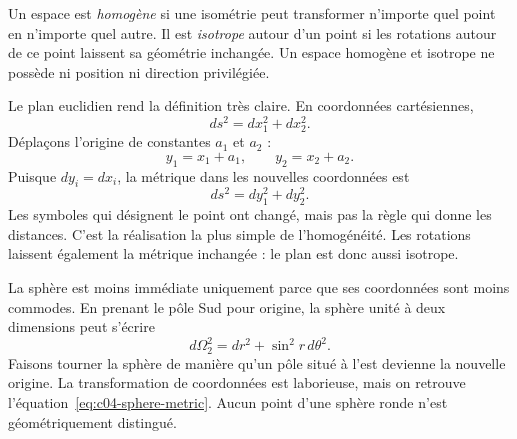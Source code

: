 \begin{definition}
Un espace est \emph{homogène} si une isométrie peut transformer n’importe quel point en n’importe quel autre. Il est \emph{isotrope} autour d’un point si les rotations autour de ce point laissent sa géométrie inchangée. Un espace homogène et isotrope ne possède ni position ni direction privilégiée.
\end{definition}

Le plan euclidien rend la définition très claire. En coordonnées cartésiennes,
\begin{equation}
ds^2=dx_1^2+dx_2^2.
\label{eq:c04-flat-metric}
\end{equation}
Déplaçons l’origine de constantes \(a_1\) et \(a_2\) :
\begin{equation}
y_1=x_1+a_1,
\qquad
y_2=x_2+a_2.
\label{eq:c04-flat-translation}
\end{equation}
Puisque \(dy_i=dx_i\), la métrique dans les nouvelles coordonnées est
\begin{equation}
ds^2=dy_1^2+dy_2^2.
\end{equation}
Les symboles qui désignent le point ont changé, mais pas la règle qui donne les distances. C’est la réalisation la plus simple de l’homogénéité. Les rotations laissent également la métrique inchangée : le plan est donc aussi isotrope.

La sphère est moins immédiate uniquement parce que ses coordonnées sont moins commodes. En prenant le pôle Sud pour origine, la sphère unité à deux dimensions peut s’écrire
\begin{equation}
d\Omega_2^2=dr^2+\sin^2 r\,d\theta^2.
\label{eq:c04-sphere-metric}
\end{equation}
Faisons tourner la sphère de manière qu’un pôle situé à l’est devienne la nouvelle origine. La transformation de coordonnées est laborieuse, mais on retrouve l’équation~\eqref{eq:c04-sphere-metric}. Aucun point d’une sphère ronde n’est géométriquement distingué.

\begin{classroomqa}
\end{classroomqa}

